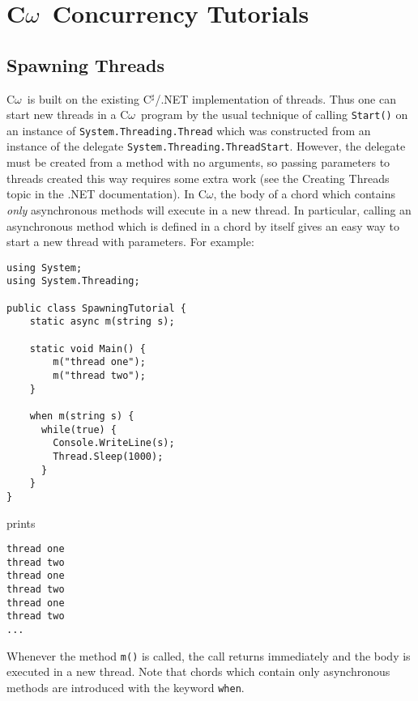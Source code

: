 \documentclass{article}
\newcommand{\comega}{\mbox{C$\omega$}}
\newcommand{\csharp}{\mbox{C$^\sharp$}}
\begin{document}
\section{\comega\ Concurrency Tutorials}
\subsection{Spawning Threads}
\comega\ is built on the existing \csharp /.NET implementation of
threads. Thus one can start new threads in a \comega\ program by the
usual technique of calling \verb|Start()| on an instance of
\texttt{System.Threading.Thread} which was constructed from an
instance of the delegate
\texttt{System.Threading.ThreadStart}. However, the delegate must be
created from a method with no arguments, so passing parameters to
threads created this way requires some extra work (see the Creating
Threads topic in the .NET documentation). In \comega, the body of a
chord which contains \emph{only} asynchronous methods will execute in
a new thread. In particular, calling an asynchronous method which is
defined in a chord by itself gives an easy way to start a new thread
with parameters. For example:
\begin{verbatim}
using System;
using System.Threading;

public class SpawningTutorial {
    static async m(string s);

    static void Main() {
        m("thread one");
        m("thread two");
    }
    
    when m(string s) {
      while(true) {
        Console.WriteLine(s);
        Thread.Sleep(1000);
      }
    }
}
\end{verbatim}
prints
\begin{verbatim}
thread one
thread two
thread one
thread two
thread one
thread two
...
\end{verbatim}
Whenever the method \verb|m()| is called, the call returns immediately
and the body is executed in a new thread. Note that chords which
contain only asynchronous methods are introduced with the keyword
\verb|when|.
\end{document}
